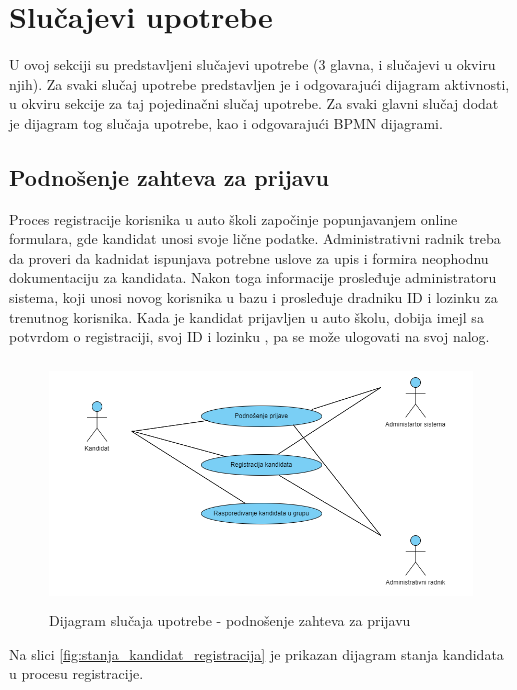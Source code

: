 \section{Slučajevi upotrebe}
\label{sec:podnaslov2}
U ovoj sekciji su predstavljeni slučajevi upotrebe (3 glavna, i slučajevi u okviru njih).
Za svaki slučaj upotrebe predstavljen je i odgovarajući dijagram aktivnosti, 
u okviru sekcije za taj pojedinačni slučaj upotrebe.
Za svaki glavni slučaj dodat je dijagram tog slučaja upotrebe, kao i odgovarajući BPMN dijagrami.
\subsection {Podnošenje zahteva za prijavu}
Proces registracije korisnika u auto školi započinje popunjavanjem online formulara, gde kandidat unosi svoje lične podatke. 
Administrativni radnik treba da proveri da kadnidat ispunjava potrebne uslove za upis i formira neophodnu dokumentaciju za kandidata. 
Nakon toga informacije prosleđuje administratoru sistema, koji unosi novog korisnika u bazu i prosleđuje dradniku ID i lozinku za trenutnog korisnika. 
Kada je kandidat prijavljen u auto školu, dobija imejl sa potvrdom o registraciji, svoj ID i lozinku , pa se može ulogovati na svoj nalog. 

\begin{figure}[H]
    \begin{center}
        \includegraphics[width=170mm, height=65mm]{Diagrams/podnosenje_zahteva_za_prijavu.png}
    \end{center}
    \caption {Dijagram slučaja upotrebe - podnošenje zahteva za prijavu}
    \label{usecase_podnosenje_zahteva_za_prijavu}

\end{figure}

Na slici \ref{fig:stanja_kandidat_registracija} je prikazan dijagram stanja kandidata u procesu registracije.

